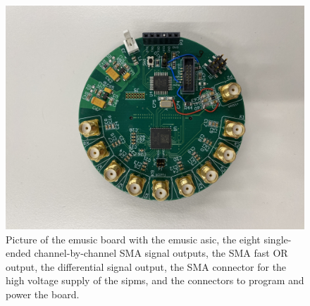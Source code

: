 \begin{figure}
	\centering
	\includegraphics[width=1.\textwidth]{pictures/emusic_board}
	\caption[eMUSIC Board]{Picture of the \ac{emusic} board with the \ac{emusic} \ac{asic}, the eight single-ended channel-by-channel SMA signal outputs, the SMA fast OR output, the differential signal output, the SMA connector for the high voltage supply of the \acp{sipm}, and the connectors to program and power the board.}
	\label{fig:emusic_board}
\end{figure}





